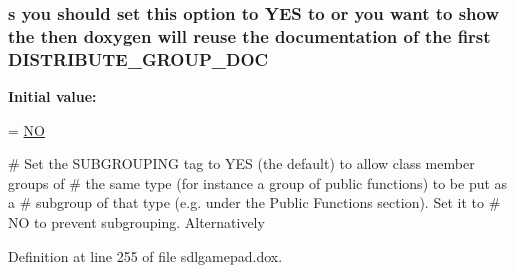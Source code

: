 \hypertarget{sdlgamepad_8dox_a2d6cc054818b29cdad766ec1e51d30f0}{
\subsubsection[{D\-I\-S\-T\-R\-I\-B\-U\-T\-E\-\_\-\-G\-R\-O\-U\-P\-\_\-\-D\-O\-C}]{ {\bf s} you should {\bf set} this option to Y\-E\-S to or you want to show the then doxygen will reuse the documentation of the {\bf first} D\-I\-S\-T\-R\-I\-B\-U\-T\-E\-\_\-\-G\-R\-O\-U\-P\-\_\-\-D\-O\-C}}\label{sdlgamepad_8dox_a2d6cc054818b29cdad766ec1e51d30f0}
{\bfseries Initial value\-:}
\begin{DoxyCode}
= \hyperlink{sdlgamepad_8dox_a0f6a46245280dc38baf9600906aa1393}{NO}

\textcolor{preprocessor}{# Set the SUBGROUPING tag to YES (the default) to allow class member groups of}
\textcolor{preprocessor}{}\textcolor{preprocessor}{# the same type (for instance a group of public functions) to be put as a}
\textcolor{preprocessor}{}\textcolor{preprocessor}{# subgroup of that type (e.g. under the Public Functions section). Set it to}
\textcolor{preprocessor}{# NO to prevent subgrouping. Alternatively}
\end{DoxyCode}


Definition at line 255 of file sdlgamepad.\-dox.


